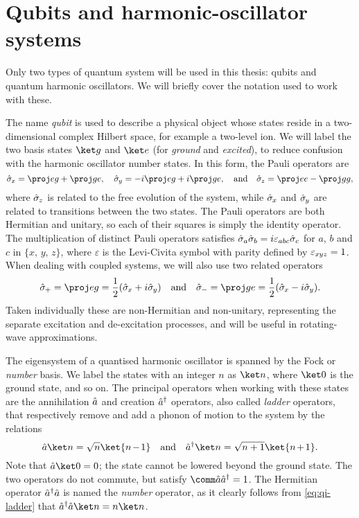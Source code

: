 \section{Qubits and harmonic-oscillator systems}

Only two types of quantum system will be used in this thesis: qubits and quantum harmonic oscillators.
We will briefly cover the notation used to work with these.

The name \emph{qubit} is used to describe a physical object whose states reside in a two-dimensional complex Hilbert space, for example a two-level ion.
We will label the two basis states $\ket g$ and $\ket e$ (for \emph{ground} and \emph{excited}), to reduce confusion with the harmonic oscillator number states.
In this form, the Pauli operators are
\begin{equation}
    \sx = \proj eg + \proj ge, \quad
    \sy = -i\proj eg + i\proj ge,\quad\text{and}\quad
    \sz = \proj ee - \proj gg,
\end{equation}
where $\hat{\sigma}_{\mkern-1mu z}$ is related to the free evolution of the system, while $\hat{\sigma}_{\mkern-1mu x}$ and $\hat{\sigma}_{\mkern-1mu y}$ are related to transitions between the two states.
The Pauli operators are both Hermitian and unitary, so each of their squares is simply the identity operator.
The multiplication of distinct Pauli operators satisfies $\hat{\sigma}_a\hat{\sigma}_b = i\varepsilon_{abc}\hat{\sigma}_c$ for $a$, $b$ and $c$ in $\{x,\,y,\,z\}$, where $\varepsilon$ is the Levi-Civita symbol with parity defined by $\varepsilon_{x\mkern-1mu yz}=1$.
When dealing with coupled systems, we will also use two related operators
\begin{equation}
    \sp = \proj eg = \frac12(\sx + i\sy)\quad\text{and}\quad
    \sm = \proj ge = \frac12(\sx - i\sy).
\end{equation}
Taken individually these are non-Hermitian and non-unitary, representing the separate excitation and de-excitation processes, and will be useful in rotating-wave approximations.

The eigensystem of a quantised harmonic oscillator is spanned by the Fock or \emph{number} basis.
We label the states with an integer $n$ as $\ket n$, where $\ket 0$ is the ground state, and so on.
The principal operators when working with these states are the annihilation $\hat{a}$ and creation $\hat{a}^\dagger$ operators, also called \emph{ladder} operators, that respectively remove and add a phonon of motion to the system by the relations
\begin{equation}\label{eq:qi-ladder}
\a\ket n = \sqrt n\ket{\msquash{n-1}}\quad\text{and}\quad\a^\dagger\ket n = \sqrt{n+1}\ket{\msquash{n+1}}.
\end{equation}
Note that $\a\ket 0 = 0$; the state cannot be lowered beyond the ground state.
The two operators do not commute, but satisfy $\comm\a{\a^\dagger} = 1$.
The Hermitian operator $\hat{a}^\dagger\hat{a}$ is named the \emph{number} operator, as it clearly follows from \cref{eq:qi-ladder} that $\a^\dagger\a\ket n = n\ket n$.

